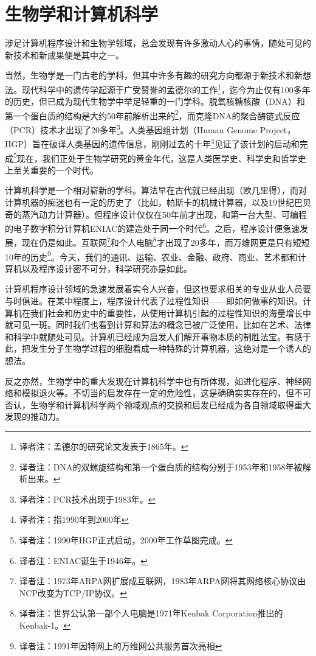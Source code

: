 \chapter{生物学和计算机科学}
\label{chap:chapter1}
\minitoc

涉足计算机程序设计和生物学领域，总会发现有许多激动人心的事情，随处可见的新技术和新成果便是其中之一。

当然，生物学是一门古老的学科，但其中许多有趣的研究方向都源于新技术和新想法。现代科学中的遗传学起源于广受赞誉的孟德尔的工作\footnote{译者注：孟德尔的研究论文发表于1865年。}，迄今为止仅有100多年的历史，但已成为现代生物学中举足轻重的一门学科。脱氧核糖核酸（DNA）和第一个蛋白质的结构是大约50年前解析出来的\footnote{译者注：DNA的双螺旋结构和第一个蛋白质的结构分别于1953年和1958年被解析出来。}，而克隆DNA的聚合酶链式反应（PCR）技术才出现了20多年\footnote{译者注：PCR技术出现于1983年。}。人类基因组计划（Human Genome Project，HGP）旨在破译人类基因的遗传信息，刚刚过去的十年\footnote{译者注：指1990年到2000年}见证了该计划的启动和完成\footnote{译者注：1990年HGP正式启动，2000年工作草图完成。}现在，我们正处于生物学研究的黄金年代，这是人类医学史、科学史和哲学史上至关重要的一个时代。

计算机科学是一个相对崭新的学科。算法早在古代就已经出现（欧几里得），而对计算机器的痴迷也有一定的历史了（比如，帕斯卡的机械计算器，以及19世纪巴贝奇的蒸汽动力计算器）。但程序设计仅仅在50年前才出现，和第一台大型、可编程的电子数字积分计算机ENIAC的建造处于同一个时代\footnote{译者注：ENIAC诞生于1946年。}。之后，程序设计便急速发展，现在仍是如此。互联网\footnote{译者注：1973年ARPA网扩展成互联网，1983年ARPA网将其网络核心协议由NCP改变为TCP/IP协议。}和个人电脑\footnote{译者注：世界公认第一部个人电脑是1971年Kenbak
Corporation推出的Kenbak-1。}才出现了20多年，而万维网更是只有短短10年的历史\footnote{译者注：1991年因特网上的万维网公共服务首次亮相}。今天，我们的通讯、运输、农业、金融、政府、商业、艺术都和计算机以及程序设计密不可分，科学研究亦是如此。

计算机程序设计领域的急速发展着实令人兴奋，但这也要求相关的专业从业人员要与时俱进。在某中程度上，程序设计代表了过程性知识——即如何做事的知识。计算机在我们社会和历史中的重要性，从使用计算机引起的过程性知识的海量增长中就可见一斑。同时我们也看到计算和算法的概念已被广泛使用，比如在艺术、法律和科学中就随处可见。计算机已经成为启发人们解开事物本质的制胜法宝。有感于此，把发生分子生物学过程的细胞看成一种特殊的计算机器，这绝对是一个诱人的想法。

反之亦然，生物学中的重大发现在计算机科学中也有所体现，如进化程序、神经网络和模拟退火等。不切当的启发存在一定的危险性，这是确确实实存在的，但不可否认，生物学和计算机科学两个领域观点的交换和启发已经成为各自领域取得重大发现的推动力。

